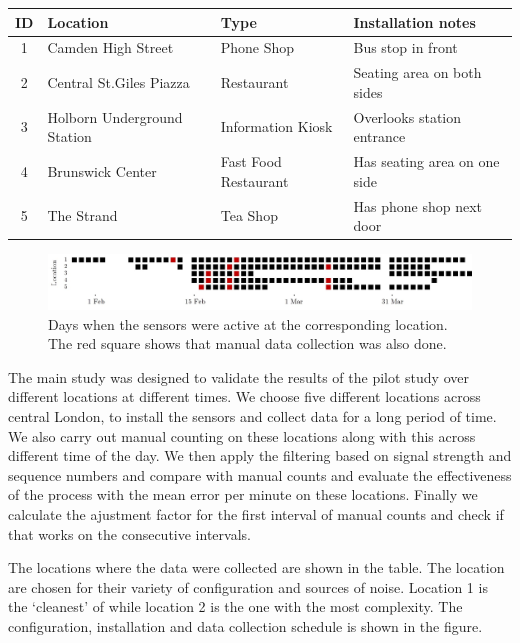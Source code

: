 \begin{table}
	{\begin{tabular}{clll} 
		\toprule
		 ID & Location & Type & Installation notes\\
		 \midrule
		 1 & Camden High Street & Phone Shop & Bus stop in front\\
		 2 & Central St.Giles Piazza & Restaurant & Seating area on both sides\\
		 3 & Holborn Underground Station & Information Kiosk & Overlooks station entrance\\
		 4 & Brunswick Center & Fast Food Restaurant & Has seating area on one side\\
		 5 & The Strand & Tea Shop & Has phone shop next door \\
		 \bottomrule
	\end{tabular}}
	\label{locations-table}
\end{table}

\begin{figure}
	\begin{center}
		\includegraphics [width=0.90\linewidth] {images/main_schedule.jpeg}
		\caption{Days when the sensors were active at the corresponding location. The red square shows that manual data collection was also done.}
		\label{pilot_clustering}
	\end{center}
\end{figure}

The main study was designed to validate the results of the pilot study over different locations at different times. 
We choose five different locations across central London, to install the sensors and collect data for a long period of time. 
We also carry out manual counting on these locations along with this across different time of the day. 
We then apply the filtering based on signal strength and sequence numbers and compare with manual counts and evaluate the effectiveness of the process with the mean error per minute on these locations. 
Finally we calculate the ajustment factor for the first interval of manual counts and check if that works on the consecutive intervals. 

The locations where the data were collected are shown in the table. The location are chosen for their variety of configuration and sources of noise. Location 1 is the `cleanest' of while location 2 is the one with the most complexity. The configuration, installation and data collection schedule is shown in the figure. 

